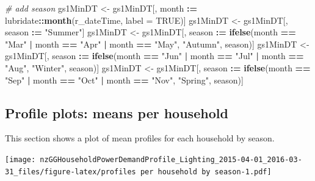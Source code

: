 \documentclass[]{article}
\newenvironment{Shaded}{\begin{snugshade}}{\end{snugshade}}
\newcommand{\KeywordTok}[1]{\textcolor[rgb]{0.13,0.29,0.53}{\textbf{#1}}}
\newcommand{\DataTypeTok}[1]{\textcolor[rgb]{0.13,0.29,0.53}{#1}}
\newcommand{\StringTok}[1]{\textcolor[rgb]{0.31,0.60,0.02}{#1}}
\newcommand{\CommentTok}[1]{\textcolor[rgb]{0.56,0.35,0.01}{\textit{#1}}}
\newcommand{\OtherTok}[1]{\textcolor[rgb]{0.56,0.35,0.01}{#1}}
\newcommand{\OperatorTok}[1]{\textcolor[rgb]{0.81,0.36,0.00}{\textbf{#1}}}
\newcommand{\ErrorTok}[1]{\textcolor[rgb]{0.64,0.00,0.00}{\textbf{#1}}}
\newcommand{\NormalTok}[1]{#1}
\begin{document}
\begin{Shaded}
\begin{Highlighting}[]
\CommentTok{# add season}
\NormalTok{gs1MinDT <-}\StringTok{ }\NormalTok{gs1MinDT[, month }\OperatorTok{:}\ErrorTok{=}\StringTok{ }\NormalTok{lubridate}\OperatorTok{::}\KeywordTok{month}\NormalTok{(r_dateTime, }\DataTypeTok{label =} \OtherTok{TRUE}\NormalTok{)]}
\NormalTok{gs1MinDT <-}\StringTok{ }\NormalTok{gs1MinDT[, season }\OperatorTok{:}\ErrorTok{=}\StringTok{ "Summer"}\NormalTok{]}
\NormalTok{gs1MinDT <-}\StringTok{ }\NormalTok{gs1MinDT[, season }\OperatorTok{:}\ErrorTok{=}\StringTok{ }\KeywordTok{ifelse}\NormalTok{(month }\OperatorTok{==}\StringTok{ "Mar"} \OperatorTok{|}
\StringTok{                                              }\NormalTok{month }\OperatorTok{==}\StringTok{ "Apr"} \OperatorTok{|}
\StringTok{                                              }\NormalTok{month }\OperatorTok{==}\StringTok{ "May"}\NormalTok{, }\StringTok{"Autumn"}\NormalTok{, season)]}
\NormalTok{gs1MinDT <-}\StringTok{ }\NormalTok{gs1MinDT[, season }\OperatorTok{:}\ErrorTok{=}\StringTok{ }\KeywordTok{ifelse}\NormalTok{(month }\OperatorTok{==}\StringTok{ "Jun"} \OperatorTok{|}
\StringTok{                                              }\NormalTok{month }\OperatorTok{==}\StringTok{ "Jul"} \OperatorTok{|}
\StringTok{                                              }\NormalTok{month }\OperatorTok{==}\StringTok{ "Aug"}\NormalTok{, }\StringTok{"Winter"}\NormalTok{, season)]}
\NormalTok{gs1MinDT <-}\StringTok{ }\NormalTok{gs1MinDT[, season }\OperatorTok{:}\ErrorTok{=}\StringTok{ }\KeywordTok{ifelse}\NormalTok{(month }\OperatorTok{==}\StringTok{ "Sep"} \OperatorTok{|}
\StringTok{                                              }\NormalTok{month }\OperatorTok{==}\StringTok{ "Oct"} \OperatorTok{|}
\StringTok{                                              }\NormalTok{month }\OperatorTok{==}\StringTok{ "Nov"}\NormalTok{, }\StringTok{"Spring"}\NormalTok{, season)]}
\end{Highlighting}
\end{Shaded}

\subsection{Profile plots: means per
household}\label{profile-plots-means-per-household}

This section shows a plot of mean profiles for each household by season.

\texttt{[image: nzGGHouseholdPowerDemandProfile\_Lighting\_2015-04-01\_2016-03-31\_files/figure-latex/profiles per household by season-1.pdf]}
\end{document}
